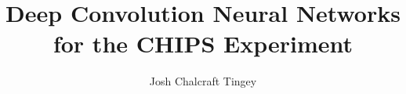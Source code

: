 \documentclass[hyperpdf,bindnopdf]{hepthesis}
\title{Deep Convolution Neural Networks for the CHIPS Experiment}
\author{Josh Chalcraft Tingey}
\begin{document}
\begin{frontmatter}
  
\end{frontmatter}

\begin{mainmatter}
  
  
  
  
  
  
  
  
\end{mainmatter}

\begin{appendices}
  
\end{appendices}

\begin{backmatter}
  
\end{backmatter}

\end{document}
